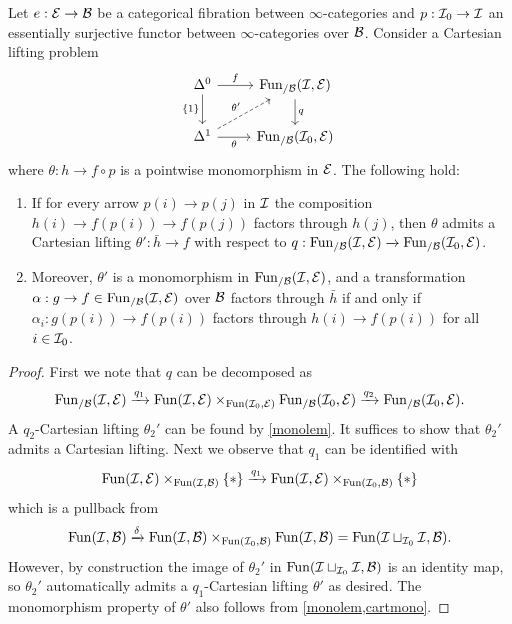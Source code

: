 \documentclass[10pt,a4paper,oneside]{article}
\begin{document}
\begin{cor}\label{monocor}
Let $e:\mathcal{E}\to\mathcal{B}$ be a categorical fibration between $\infty$-categories and $p:\mathcal{I}_0\to\mathcal{I}$ an essentially surjective functor between $\infty$-categories over $\mathcal{B}$. Consider a Cartesian lifting problem
\[
\begin{tikzcd}
\Delta^0 \arrow[d, "\{1\}"'] \arrow[r, "f"]           & {\funct_{/\mcb}(\mci,\mc{E})} \arrow[d, "q"] \\
\Delta^1 \arrow[r, "\theta"'] \arrow[ru, dashed, "\theta'"] & {\funct_{/\mcb}(\mci_0,\mce)}
\end{tikzcd}
\]
where $\theta: h\to f\circ p$ is a pointwise monomorphism in $\mathcal{E}$. The following hold:
\begin{enumerate}
\item If for every arrow $p(i) \rightarrow p(j)$ in $\mathcal{I}$ the composition $h(i) \rightarrow f(p(i)) \rightarrow f(p(j))$ factors through $h(j)$, then $\theta$ admits a Cartesian lifting $\theta':\bar{h}\to f$ with respect to  $q:\operatorname{Fun}_{/\mathcal{B}}(\mathcal{I},\mathcal{E})\xrightarrow{} \operatorname{Fun}_{/\mathcal{B}}(\mathcal{I}_0,\mathcal{E})$.
\item Moreover, $\theta'$ is a monomorphism in $\operatorname{Fun}_{/\mathcal{B}}(\mathcal{I},\mathcal{E})$, and a transformation $\alpha: g \rightarrow f \in \operatorname{Fun}_{/\mathcal{B}}(\mathcal{I},\mathcal{E})$ over $\mathcal{B}$ factors through $\bar{h}$ if and only if $\alpha_i\colon g(p(i)) \rightarrow f(p(i))$ factors through $h(i) \rightarrow f(p(i))$ for all $i \in \mathcal{I}_0$.  
\end{enumerate}
\end{cor}

\begin{proof}
First we note that $q$ can be decomposed as $$\operatorname{Fun}_{/\mathcal{B}}(\mathcal{I},\mathcal{E})\xrightarrow{q_1}\operatorname{Fun}(\mathcal{I},\mathcal{E})\times_{\operatorname{Fun}(\mathcal{I}_0,\mathcal{E})}\operatorname{Fun}_{/\mathcal{B}}(\mathcal{I}_0,\mathcal{E})\xrightarrow{q_2} \operatorname{Fun}_{/\mathcal{B}}(\mathcal{I}_0,\mathcal{E}).$$
A $q_2$-Cartesian lifting $\theta_2'$ can be found by \cref{monolem}. It suffices to show that $\theta_2'$ admits a Cartesian lifting. Next we observe that $q_1$ can be identified with
\[
\operatorname{Fun}(\mathcal{I},\mathcal{E})\times_{\operatorname{Fun}(\mathcal{I},\mathcal{B})}\{*\}\xrightarrow{q_1}\operatorname{Fun}(\mathcal{I},\mathcal{E})\times_{\operatorname{Fun}(\mathcal{I}_0,\mathcal{B})}\{*\}
\]
which is a pullback from
\[
\operatorname{Fun}(\mathcal{I},\mathcal{B})\xrightarrow{\delta}\operatorname{Fun}(\mathcal{I},\mathcal{B})\times_{\operatorname{Fun}(\mathcal{I}_0,\mathcal{B})}\operatorname{Fun}(\mathcal{I},\mathcal{B})=\operatorname{Fun}(\mathcal{I}\sqcup_{\mathcal{I}_0}\mathcal{I},\mathcal{B}).
\]
However, by construction the image of $\theta_2'$ in $\operatorname{Fun}(\mathcal{I}\sqcup_{\mathcal{I}_0}\mathcal{I},\mathcal{B})$ is an identity map, so $\theta_2'$ automatically admits a $q_1$-Cartesian lifting $\theta'$ as desired. The monomorphism property of $\theta'$ also follows from \cref{monolem,cartmono}.
\end{proof}
\end{document}
